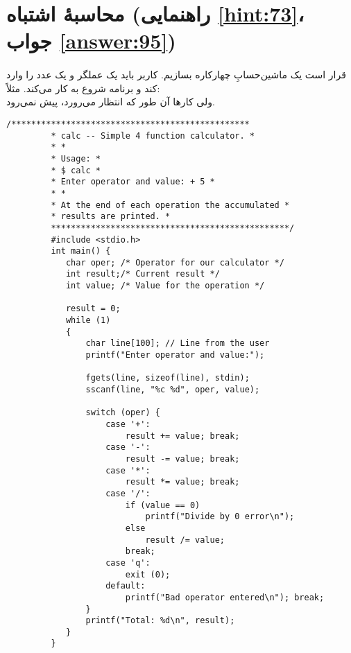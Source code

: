 \section[محاسبهٔ اشتباه]{محاسبهٔ اشتباه \protect{} (راهنمایی \ref{hint:73}، جواب \ref{answer:95})}
\paragraph{}\label{prog:68}
قرار است یک ماشین‌حسابِ چهارکاره بسازیم. کاربر باید یک عملگر و یک عدد را وارد کند و برنامه شروع به کار می‌کند. مثلاً:
\LTR\noindent
{}\\
\RTL
ولی کارها آن طور که انتظار می‌رورد، پیش نمی‌رود.

\begin{LTR}
    \begin{lstlisting}[style=C++Style]
         /************************************************
         * calc -- Simple 4 function calculator. *
         * *
         * Usage: *
         * $ calc *
         * Enter operator and value: + 5 *
         * *
         * At the end of each operation the accumulated *
         * results are printed. *
         ************************************************/
         #include <stdio.h>
         int main() {
         	char oper; /* Operator for our calculator */
         	int result;/* Current result */
         	int value; /* Value for the operation */

        	result = 0;
        	while (1)
        	{
         		char line[100]; // Line from the user
         		printf("Enter operator and value:");

         		fgets(line, sizeof(line), stdin);
         		sscanf(line, "%c %d", oper, value);

         		switch (oper) {
         			case '+':
         				result += value; break;
         			case '-':
         				result -= value; break;
         			case '*':
         				result *= value; break;
         			case '/':
         				if (value == 0)
         					printf("Divide by 0 error\n");
         				else
         					result /= value;
         				break;
         			case 'q':
         				exit (0);
         			default:
         				printf("Bad operator entered\n"); break;
         		}
         		printf("Total: %d\n", result);
         	}
         }
    \end{lstlisting}
\end{LTR}